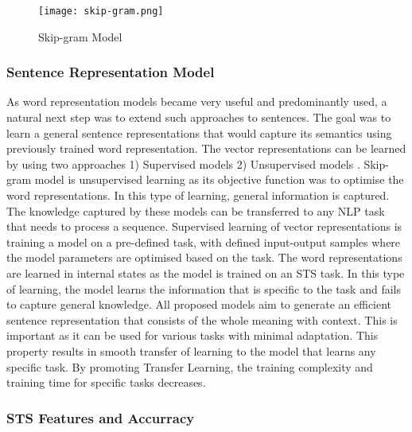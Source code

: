 \documentclass[12pt]{report} %
\begin{document}
\begin{figure}[!tbp]
	\centering
	\texttt{[image: skip-gram.png]}
	\caption{Skip-gram Model \citep{jurafsky2014speech}}
	\label{skipgram}
\end{figure}

\subsubsection{Sentence Representation Model}
As word representation models became very useful and predominantly used, a natural next step was to extend such approaches to sentences. The goal was to learn a general sentence representations that would capture its semantics using previously trained word representation.
The vector representations can be learned by using two approaches 1) Supervised models \citep{conneau2017supervised} 2) Unsupervised models \citep{kiros2015skip}. Skip-gram model is unsupervised learning as its objective function was to optimise the word representations. In this type of learning, general information is captured. The knowledge captured by these models can be transferred to any NLP task that needs to process a sequence. Supervised learning of vector representations is training a model on a pre-defined task, with defined input-output samples where the model parameters are optimised based on the task. The word representations are learned in internal states as the model is trained on an STS task. In this type of learning, the model learns the information that is specific to the task and fails to capture general knowledge. All proposed models aim to generate an efficient sentence representation that consists of the whole meaning with context. This is important as it can be used for various tasks with minimal adaptation. This property results in smooth transfer of learning to the model that learns any specific task. By promoting Transfer Learning, the training complexity and training time for specific tasks decreases.  

\subsubsection{STS Features and Accurracy}
\end{document}
